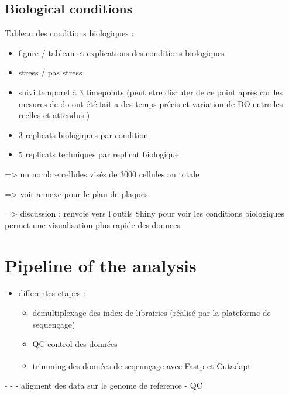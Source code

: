 \documentclass[
  11pt,
  a4paper,
]{report}
\begin{document}
\section{Biological conditions}\label{biological-conditions}

Tableau des conditions biologiques :

\begin{itemize}
\item
  figure / tableau et explications des conditions biologiques
\item
  stress / pas stress
\item
  suivi temporel à 3 timepoints (peut etre discuter de ce point après
  car les mesures de do ont été fait a des temps précis et variation de
  DO entre les reelles et attendus )
\item
  3 replicats biologiques par condition
\item
  5 replicats techniques par replicat biologique
\end{itemize}

=\textgreater{} un nombre cellules visés de 3000 cellules au totale

=\textgreater{} voir annexe pour le plan de plaques

=\textgreater{} discussion : renvoie vers l'outils Shiny pour voir les
conditions biologiques permet une visualisation plus rapide des donnees


\chapter{Pipeline of the analysis}\label{pipeline-of-the-analysis}

\begin{itemize}
\item
  differentes etapes :

  \begin{itemize}
  \item
    demultiplexage des index de librairies (réalisé par la plateforme de
    sequençage)
  \item
    QC control des données
  \item
    trimming des données de seqeunçage avec
    Fastp\textsuperscript{} et
    Cutadapt\textsuperscript{}
  \end{itemize}
\end{itemize}

- - - aligment des data sur le genome de reference - QC
\end{document}
